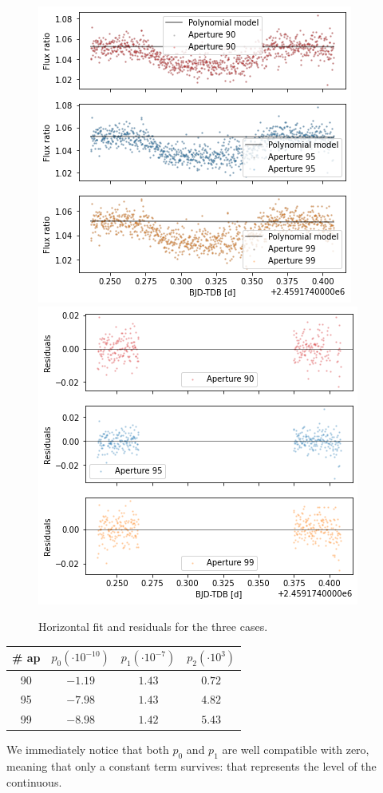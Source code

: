 \documentclass[a4paper,11pt,twocolumn]{article}
\begin{document}
\begin{figure}
    \centering  
    \includegraphics[scale=0.45, angle=0]{../pictures/taste/fit.png}
    \includegraphics[scale=0.45, angle=0]{../pictures/taste/residuals.png}
    \caption{Horizontal fit and residuals for the three cases.}
    \label{fig:fit}
\end{figure}
\begin{center}
    \begin{tabular}{cccc}
    \hline
    \# ap & $p_0 (\cdot 10^{-10})$ & $p_1 (\cdot 10^{-7})$ & $p_2 ( \cdot 10^3)$ \\
    \hline
    90 & $-1.19$ & $1.43$  & $0.72$\\
    95 & $-7.98$ & $1.43$  &  $4.82$\\
    99 & $-8.98$ & $1.42$  & $5.43$\\
    \hline
    \end{tabular}
\end{center}
We immediately notice that both $p_0$ and $p_1$ are well compatible with zero,
meaning that only a constant term survives: that represents the level of the 
continuous. 
\end{document}
